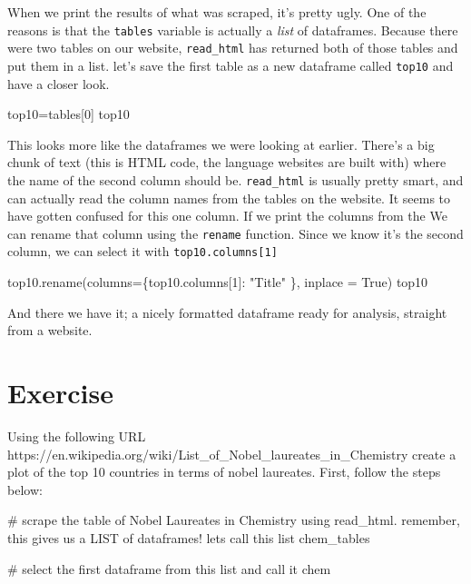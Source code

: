\documentclass[
  letterpaper,
  DIV=11,
  numbers=noendperiod]{scrreprt}
\newenvironment{Shaded}{\begin{snugshade}}{\end{snugshade}}
\newcommand{\CommentTok}[1]{\textcolor[rgb]{0.37,0.37,0.37}{#1}}
\newcommand{\DecValTok}[1]{\textcolor[rgb]{0.68,0.00,0.00}{#1}}
\newcommand{\NormalTok}[1]{\textcolor[rgb]{0.00,0.23,0.31}{#1}}
\newcommand{\OperatorTok}[1]{\textcolor[rgb]{0.37,0.37,0.37}{#1}}
\newcommand{\StringTok}[1]{\textcolor[rgb]{0.13,0.47,0.30}{#1}}
\newcommand{\VariableTok}[1]{\textcolor[rgb]{0.07,0.07,0.07}{#1}}
\begin{document}
When we print the results of what was scraped, it's pretty ugly. One of
the reasons is that the \texttt{tables} variable is actually a
\emph{list} of dataframes. Because there were two tables on our website,
\texttt{read\_html} has returned both of those tables and put them in a
list. let's save the first table as a new dataframe called
\texttt{top10} and have a closer look.

\begin{Shaded}
\begin{Highlighting}[]
\NormalTok{top10}\OperatorTok{=}\NormalTok{tables[}\DecValTok{0}\NormalTok{]}
\NormalTok{top10}
\end{Highlighting}
\end{Shaded}

This looks more like the dataframes we were looking at earlier. There's
a big chunk of text (this is HTML code, the language websites are built
with) where the name of the second column should be. \texttt{read\_html}
is usually pretty smart, and can actually read the column names from the
tables on the website. It seems to have gotten confused for this one
column. If we print the columns from the We can rename that column using
the \texttt{rename} function. Since we know it's the second column, we
can select it with \texttt{top10.columns{[}1{]}}

\begin{Shaded}
\begin{Highlighting}[]
\NormalTok{top10.rename(columns}\OperatorTok{=}\NormalTok{\{top10.columns[}\DecValTok{1}\NormalTok{]: }\StringTok{"Title"}\NormalTok{ \}, inplace }\OperatorTok{=} \VariableTok{True}\NormalTok{)}
\NormalTok{top10}
\end{Highlighting}
\end{Shaded}

And there we have it; a nicely formatted dataframe ready for analysis,
straight from a website.

\hypertarget{exercise-3}{%
\section{Exercise}\label{exercise-3}}

Using the following URL
https://en.wikipedia.org/wiki/List\_of\_Nobel\_laureates\_in\_Chemistry
create a plot of the top 10 countries in terms of nobel laureates.
First, follow the steps below:

\begin{Shaded}
\begin{Highlighting}[]
\CommentTok{\# scrape the table of Nobel Laureates in Chemistry using read\_html. remember, this gives us a LIST of dataframes! lets call this list chem\_tables}

\CommentTok{\# select the first dataframe from this list and call it chem}
\end{Highlighting}
\end{Shaded}
\end{document}
